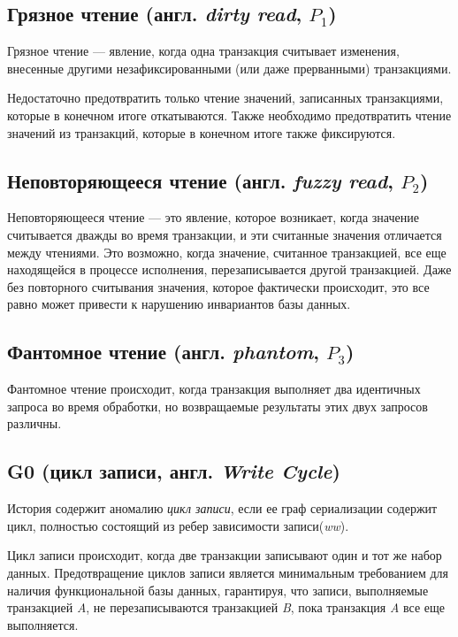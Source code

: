 \documentclass[14pt,  openany]{book}
\begin{document}
\subsection{Грязное чтение (англ. \textit{dirty read}, $P_1$)}
Грязное чтение --- явление, когда одна транзакция считывает изменения, внесенные другими незафиксированными (или даже прерванными) транзакциями. \cite{sookocheff}
\par Недостаточно предотвратить только чтение значений, записанных транзакциями, которые в конечном итоге откатываются. Также необходимо предотвратить чтение значений из транзакций, которые в конечном итоге также фиксируются.  \cite{CritiqueANSI_SQL}

\subsection{Неповторяющееся чтение (англ. \textit{fuzzy read}, $P_2$)}
Неповторяющееся чтение --- это явление, которое возникает, когда значение считывается дважды во время транзакции, и эти считанные значения отличается между чтениями.  Это возможно, когда значение, считанное транзакцией, все еще находящейся в процессе исполнения, перезаписывается другой транзакцией. Даже без повторного считывания значения, которое фактически происходит, это все равно может привести к нарушению инвариантов базы данных.  \cite{CritiqueANSI_SQL}

\subsection{Фантомное чтение (англ. \textit{phantom}, $P_3$)}
Фантомное чтение происходит, когда транзакция выполняет два идентичных запроса во время обработки, но возвращаемые результаты этих двух запросов различны.  \cite{sookocheff}

\subsection{G0 (цикл записи, англ. \textit{Write Cycle})}
История содержит аномалию \textit{цикл записи}, если ее граф сериализации содержит цикл, полностью состоящий из ребер зависимости записи(\textit{ww}). 
\par Цикл записи происходит, когда две транзакции записывают один и тот же набор данных. Предотвращение циклов записи является минимальным требованием для наличия функциональной базы данных, гарантируя, что записи, выполняемые транзакцией \textit{A}, не перезаписываются транзакцией \textit{B}, пока транзакция \textit{A} все еще выполняется.  \cite{sookocheff}
\end{document}
